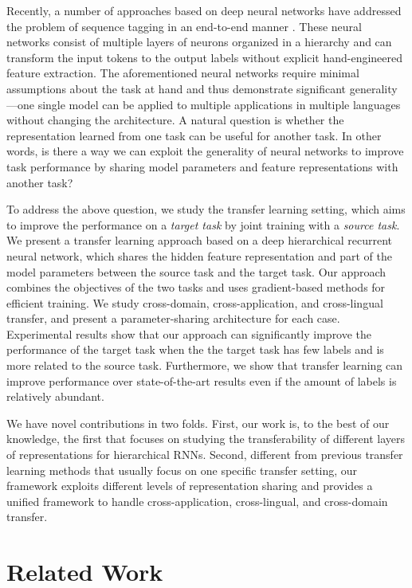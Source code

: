 \documentclass{article} \usepackage{iclr2017_conference,times}
\begin{document}
Recently, a number of approaches based on deep neural networks have addressed the problem of sequence tagging in an end-to-end manner \citep{collobert2011natural,lample2016neural,ling2015finding,ma2016end}. These neural networks consist of multiple layers of neurons organized in a hierarchy and can transform the input tokens to the output labels without explicit hand-engineered feature extraction. The aforementioned neural networks require minimal assumptions about the task at hand and thus demonstrate significant generality---one single model can be applied to multiple applications in multiple languages without changing the architecture. A natural question is whether the representation learned from one task can be useful for another task. In other words, is there a way we can exploit the generality of neural networks to improve task performance by sharing model parameters and feature representations with another task?

To address the above question, we study the transfer learning setting, which aims to improve the performance on a \textit{target task} by joint training with a \textit{source task}. We present a transfer learning approach based on a deep hierarchical recurrent neural network, which shares the hidden feature representation and part of the model parameters between the source task and the target task. Our approach combines the objectives of the two tasks and uses gradient-based methods for efficient training.
We study cross-domain, cross-application, and cross-lingual transfer, and present a parameter-sharing architecture for each case.
Experimental results show that our approach can significantly improve the performance of the target task when the the target task has few labels and is more related to the source task. Furthermore, we show that transfer learning can improve performance over state-of-the-art results even if the amount of labels is relatively abundant.

We have novel contributions in two folds. First, our work is, to the best of our knowledge, the first that focuses on studying the transferability of different layers of representations for hierarchical RNNs. Second, different from previous transfer learning methods that usually focus on one specific transfer setting, our framework exploits different levels of representation sharing and provides a unified framework to handle cross-application, cross-lingual, and cross-domain transfer.

 
\section{Related Work}
\end{document}
